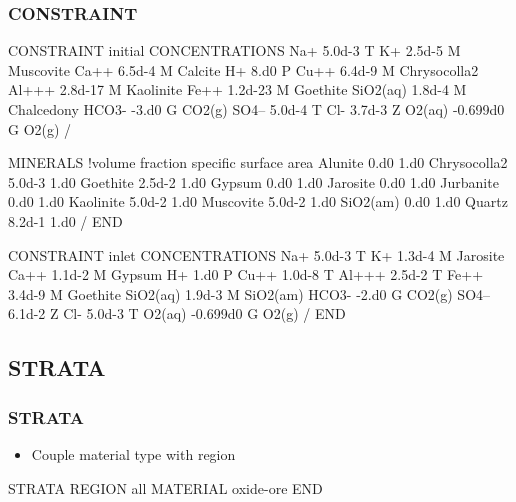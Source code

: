 \documentclass{beamer}
\begin{document}
\newpage

\begin{frame}\frametitle{\bf CONSTRAINT}

\begin{semiverbatim}

CONSTRAINT initial
  CONCENTRATIONS
    Na+        5.0d-3   T
    K+         2.5d-5   M Muscovite
    Ca++       6.5d-4   M Calcite
    H+         8.d0     P
    Cu++       6.4d-9   M Chrysocolla2
    Al+++      2.8d-17  M Kaolinite
    Fe++       1.2d-23  M Goethite
    SiO2(aq)   1.8d-4   M Chalcedony
    HCO3-      -3.d0    G CO2(g)
    SO4--      5.0d-4   T
    Cl-        3.7d-3   Z
    O2(aq)     -0.699d0 G O2(g)
  /
\end{semiverbatim}

  \newpage
\begin{semiverbatim}

  MINERALS !volume fraction specific surface area
    Alunite       0.d0    1.d0
    Chrysocolla2  5.0d-3  1.d0
    Goethite      2.5d-2  1.d0
    Gypsum        0.d0    1.d0
    Jarosite      0.d0    1.d0
    Jurbanite     0.d0    1.d0
    Kaolinite     5.0d-2  1.d0
    Muscovite     5.0d-2  1.d0
    SiO2(am)      0.d0    1.d0
    Quartz        8.2d-1  1.d0
  /
END
\end{semiverbatim}

\newpage
\begin{semiverbatim}
CONSTRAINT inlet
  CONCENTRATIONS
    Na+        5.0d-3   T
    K+         1.3d-4   M Jarosite
    Ca++       1.1d-2   M Gypsum
    H+         1.d0     P
    Cu++       1.0d-8   T
    Al+++      2.5d-2   T
    Fe++       3.4d-9   M Goethite
    SiO2(aq)   1.9d-3   M SiO2(am)
    HCO3-      -2.d0    G CO2(g)
    SO4--      6.1d-2   Z
    Cl-        5.0d-3   T
    O2(aq)     -0.699d0 G O2(g)
  /
END
\end{semiverbatim}

\end{frame}

\subsection{STRATA}

\begin{frame}[fragile]\frametitle{\bf STRATA}

\begin{itemize}
\item Couple material type with region
\end{itemize}

\begin{semiverbatim}
STRATA
  REGION all
  MATERIAL oxide-ore
END
\end{semiverbatim}

\end{frame}
\end{document}
